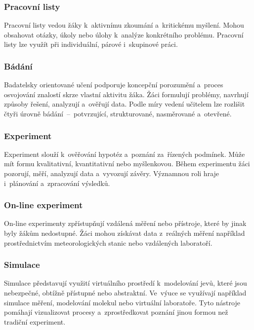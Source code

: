 \documentclass[male,czech,api_bc]{kitheses}
\begin{document}
\subsubsection{Pracovní listy}

Pracovní listy vedou žáky k~aktivnímu zkoumání a~kritickému myšlení. Mohou obsahovat otázky, úkoly nebo úlohy k~analýze konkrétního problému. Pracovní listy lze využít při individuální, párové i~skupinové práci.

\subsubsection{Bádání}

Badatelsky orientované učení podporuje koncepční porozumění a~proces osvojování znalostí skrze vlastní aktivitu žáka. Žáci formulují problémy, navrhují způsoby řešení, analyzují a~ověřují data. Podle míry vedení učitelem lze rozlišit čtyři úrovně bádání~--~potvrzující, strukturované, nasměrované a~otevřené.

\subsubsection{Experiment}

Experiment slouží k~ověřování hypotéz a~poznání za~řízených podmínek. Může mít formu kvalitativní, kvantitativní nebo myšlenkovou. Během experimentu žáci pozorují, měří, analyzují data a~vyvozují závěry. Významnou roli hraje i~plánování a~zpracování výsledků.

\subsubsection{On-line experiment}

On-line experimenty zpřístupňují vzdálená měření nebo přístroje, které by jinak byly žákům nedostupné. Žáci mohou získávat data z~reálných měření například prostřednictvím meteorologických stanic nebo vzdálených laboratoří.

\newpage

\subsubsection{Simulace}

Simulace představují využití virtuálního prostředí k~modelování jevů, které jsou nebezpečné, obtížně přístupné nebo abstraktní. Ve~výuce se využívají například simulace měření, modelování molekul nebo virtuální laboratoře. Tyto nástroje pomáhají vizualizovat procesy a~zprostředkovat poznání jinou formou než tradiční experiment.
\end{document}

